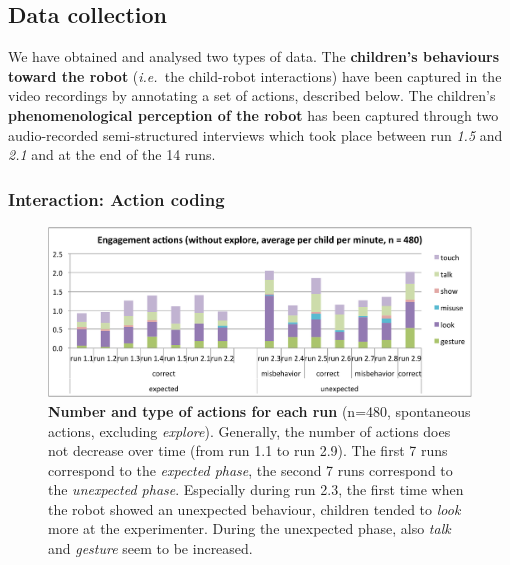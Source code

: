 \documentclass{sig-alternate}
\newcommand{\ie}{{\textit{i.e.~}}}
\begin{document}
\subsection{Data collection}


We have obtained and analysed two types of data. The \textbf{children's
behaviours toward the robot} (\ie the child-robot interactions) have been
captured in the video recordings by annotating a set of actions, described
below. The children's \textbf{phenomenological perception of the robot} has been
captured through two audio-recorded semi-structured interviews which took place
between run \emph{1.5} and \emph{2.1} and at the end of the 14 runs.


\subsubsection{Interaction: Action coding}

\begin{figure}[ht!] 
    \centering 
    \includegraphics[width=0.9\linewidth]{domino-time-active.pdf} 
    \caption{\small \textbf{Number and type of actions for each run} (n=480,
        spontaneous actions, excluding \emph{explore}). Generally, the number of
        actions does not decrease over time (from run 1.1 to run 2.9).  The
        first 7 runs correspond to the \textit{expected phase}, the second 7
        runs correspond to the \textit{unexpected phase}. Especially during run
        2.3, the first time when the robot showed an unexpected behaviour,
        children tended to \textit{look} more at the experimenter. During the
        unexpected phase, also \textit{talk} and \textit{gesture} seem to be
        increased.}

    \label{fig:domino-time-active} 
\end{figure}
\end{document}
